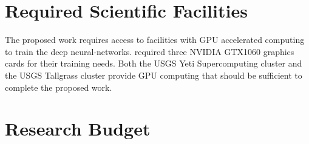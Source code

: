 \documentclass[12p]{article}
\begin{document}
\section{Required Scientific Facilities}
The proposed work requires access to facilities with GPU accelerated computing to train the deep neural-networks.
\citet{Ross2018b} required three NVIDIA GTX1060 graphics cards for their training needs. Both the USGS Yeti
Supercomputing cluster and the USGS Tallgrass cluster provide GPU computing that should be sufficient to complete the
proposed work.

\section{Research Budget}




\end{document}
